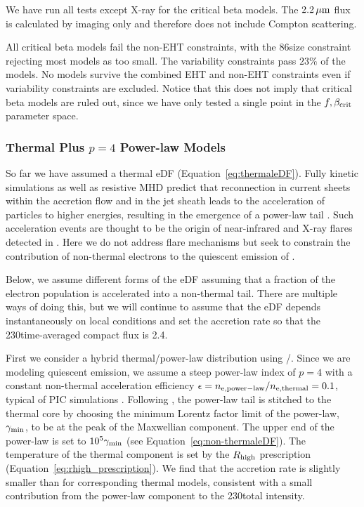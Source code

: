 We have run all tests except X-ray for the critical beta models.
The $2.2\,\mu\mathrm{m}$ flux is calculated by imaging only and therefore does not include Compton scattering.

All critical beta models fail the non-EHT constraints, with the 86\GHz size constraint rejecting most models as too small.
The variability constraints pass $23\%$ of the models.
No models survive the combined EHT and non-EHT constraints even if variability constraints are excluded.
Notice that this does not imply that critical beta models are ruled out, since we have only tested a single point in the $f,\beta_{\rm crit}$ parameter space.

\subsubsection{Thermal Plus \texorpdfstring{$p = 4$}{p=4} Power-law Models}

So far we have assumed a thermal eDF (Equation~\ref{eq:thermaleDF}).
Fully kinetic simulations as well as resistive MHD predict that reconnection in current sheets within the accretion flow and in the jet sheath leads to the acceleration of particles to higher energies, resulting in the emergence of a power-law tail  \citep[e.g.,][and references therein]{Sironi2021}.
Such acceleration events are thought to be the origin of near-infrared and X-ray flares detected in \sgra.
Here we do not address flare mechanisms but seek to constrain the contribution of non-thermal electrons to the quiescent emission of \sgra.

Below, we assume different forms of the eDF assuming that a fraction of the electron population is accelerated into a non-thermal tail.
There are multiple ways of doing this, but we will continue to assume that the eDF depends instantaneously on local conditions and set the accretion rate so that the 230\GHz time-averaged compact flux is 2.4\Jy.

First we consider a hybrid thermal/power-law distribution using \hamr/\bhoss.
Since we are modeling quiescent emission, we assume a steep power-law index of $p=4$ with a constant non-thermal acceleration efficiency $\epsilon=n_{\rm e, power-law}/n_{\rm e, thermal}=0.1$, typical of PIC simulations \citep[e.g.,][]{Sironi2015,Crumley2019}.
Following \citet{Chatterjee2021}, the power-law tail is stitched to the thermal core by choosing the minimum Lorentz factor limit of the power-law, $\gamma_{\rm min}$, to be at the peak of the Maxwellian component.
The upper end of the power-law is set to $10^5 \gamma_{\rm min}$ (see Equation~\ref{eq:non-thermaleDF}).
The temperature of the thermal component is set by the $R_\mathrm{high}$ prescription (Equation~\ref{eq:rhigh_prescription}).
We find that the accretion rate is slightly smaller than for corresponding thermal models, consistent with a small contribution from the power-law component to the 230\GHz total intensity.


